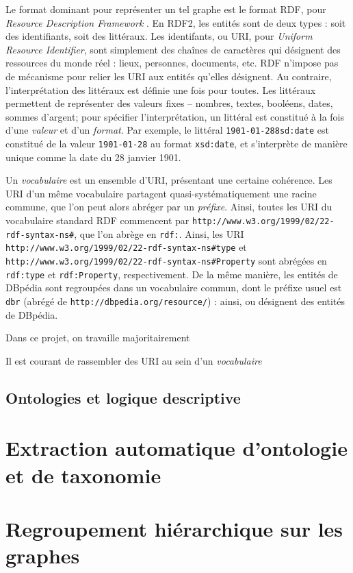 Le format dominant pour représenter un tel graphe est le format RDF, pour \textit{Resource Description Framework} \cite{cyganiak14}. En RDF2, les entités sont de deux types : soit des identifiants, soit des littéraux. Les identifants, ou URI, pour \textit{Uniform Resource Identifier}, sont simplement des chaînes de caractères qui désignent des ressources du monde réel : lieux, personnes, documents, etc. %
RDF n'impose pas de mécanisme pour relier les URI aux entités qu'elles désignent. Au contraire, l'interprétation des littéraux est définie une fois pour toutes. Les littéraux permettent de représenter des valeurs fixes – nombres, textes, booléens, dates, sommes d'argent; pour spécifier l'interprétation, un littéral est constitué à la fois d'une \textit{valeur} et d'un \textit{format}. Par exemple, le littéral \texttt{1901-01-28^^xsd:date} est constitué de la valeur \texttt{1901-01-28} au format \texttt{xsd:date}, et s'interprète de manière unique comme la date du 28 janvier 1901.

Un \textit{vocabulaire} est un ensemble d'URI, présentant une certaine cohérence. Les URI d'un même vocabulaire partagent quasi-systématiquement une racine commune, que l'on peut alors abréger par un \textit{préfixe}. Ainsi, toutes les URI du vocabulaire standard RDF commencent par \texttt{http://www.w3.org/1999/02/22-rdf-syntax-ns#}, que l'on abrège en \texttt{rdf:}. Ainsi, les URI \texttt{http://www.w3.org/1999/02/22-rdf-syntax-ns#type} et \texttt{http://www.w3.org/1999/02/22-rdf-syntax-ns#Property} sont abrégées en \texttt{rdf:type} et \texttt{rdf:Property}, respectivement. 
De la même manière, les entités de DBpédia sont regroupées dans un vocabulaire commun, dont le préfixe usuel est \texttt{dbr} (abrégé de \texttt{http://dbpedia.org/resource/}) : ainsi,  ou  désignent des entités de DBpédia.

Dans ce projet, on travaille majoritairement 

Il est courant de rassembler des URI au sein d'un \textit{vocabulaire}



\subsection{Ontologies et logique descriptive}





\section{Extraction automatique d'ontologie et de taxonomie}






\section{Regroupement hiérarchique sur les graphes}
